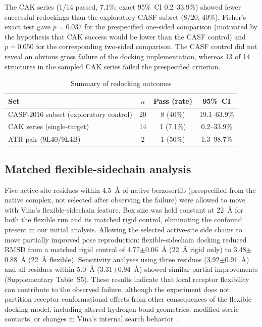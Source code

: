 \documentclass[global,twocolumn]{svjour}
\newcommand{\st}{\footnotesize\setlength{\tabcolsep}{3pt}}
\begin{document}
The CAK series (1/14 passed, 7.1\%; exact 95\%~CI 0.2--33.9\%) showed fewer
successful redockings than the exploratory CASF subset (8/20, 40\%). Fisher's
exact test gave $p=0.037$ for the prespecified one-sided comparison (motivated
by the hypothesis that CAK success would be lower than the CASF control) and
$p=0.050$ for the corresponding two-sided comparison. The CASF control did not
reveal an obvious gross failure of the docking implementation, whereas 13 of
14 structures in the sampled CAK series failed the prespecified criterion.

\begin{table}[t]
\centering
\caption{Summary of redocking outcomes}
\label{tab:casf}
\st
\begin{tabular}{lccc}
\toprule
Set & $n$ & Pass (rate) & 95\%~CI \\
\midrule
CASF-2016 subset (exploratory control) & 20 & 8 (40\%)   & 19.1--63.9\% \\
CAK series (single-target)             & 14 & 1 (7.1\%)  & 0.2--33.9\% \\
ATR pair (9L40/9L4B)                   & 2  & 1 (50\%)   & 1.3--98.7\% \\
\bottomrule
\end{tabular}
\end{table}

\subsection{Matched flexible-sidechain analysis}

Five active-site residues within 4.5~\AA{} of native berzosertib (prespecified
from the native complex, not selected after observing the failure) were
allowed to move with Vina's flexible-sidechain feature. Box size was held
constant at 22~\AA{} for both the flexible run and its matched rigid control,
eliminating the confound present in our initial analysis. Allowing the
selected active-site side chains to move partially improved pose reproduction:
flexible-sidechain docking reduced RMSD from a matched rigid control of
4.77$\pm$0.06~\AA{} (22~\AA{} rigid only) to 3.48$\pm$0.88~\AA{}
(22~\AA{} flexible). Sensitivity analyses using three residues
(3.92$\pm$0.91~\AA{}) and all residues within 5.0~\AA{}
(3.31$\pm$0.94~\AA{}) showed similar partial improvements (Supplementary
Table~S5). These results indicate that local receptor flexibility can
contribute to the observed failure, although the experiment does not
partition receptor conformational effects from other consequences of the
flexible-docking model, including altered hydrogen-bond geometries, modified
steric contacts, or changes in Vina's internal search
behavior~\cite{feinstein2021}.
\end{document}
